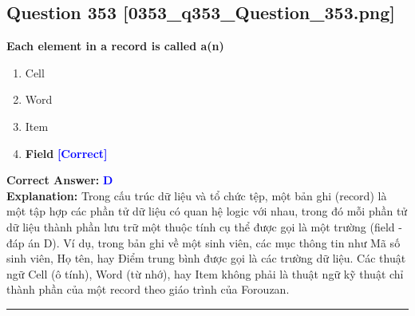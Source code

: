 \documentclass[11pt,a4paper]{article}
\begin{document}
\begin{minipage}{\textwidth}
\subsection*{Question 353 \quad \footnotesize{[0353\_q353\_Question\_353.png]}}
\noindent \textbf{Each element in a record is called a(n)}

\begin{enumerate}[label=\Alph*.]
    \item Cell
    \item Word
    \item Item
    \item \textbf{Field} \hfill \textcolor{blue}{\textbf{[Correct]}}
\end{enumerate}

\noindent \textbf{Correct Answer:} \textcolor{blue}{\textbf{D}} \\[2pt]
\noindent \textbf{Explanation:} Trong cấu trúc dữ liệu và tổ chức tệp, một bản ghi (record) là một tập hợp các phần tử dữ liệu có quan hệ logic với nhau, trong đó mỗi phần tử dữ liệu thành phần lưu trữ một thuộc tính cụ thể được gọi là một trường (field - đáp án D). Ví dụ, trong bản ghi về một sinh viên, các mục thông tin như Mã số sinh viên, Họ tên, hay Điểm trung bình được gọi là các trường dữ liệu. Các thuật ngữ Cell (ô tính), Word (từ nhớ), hay Item không phải là thuật ngữ kỹ thuật chỉ thành phần của một record theo giáo trình của Forouzan.

\par\vspace{0.3cm}
\hrule
\vspace{0.3cm}
\end{minipage}
\end{document}
